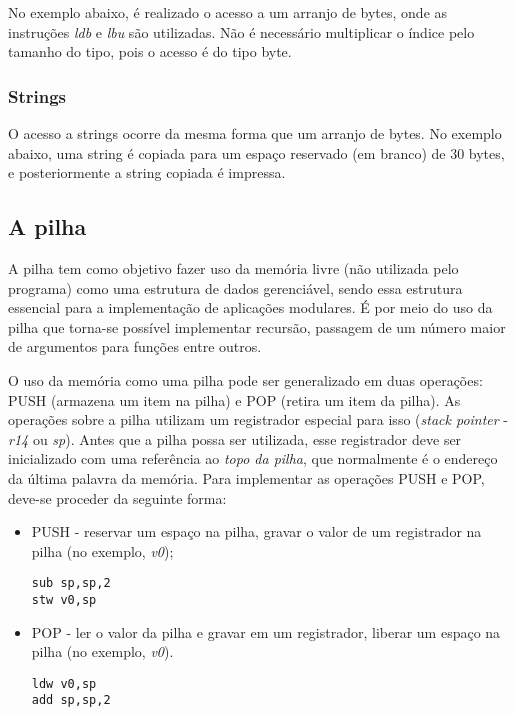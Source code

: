 \documentclass[11pt,a4paper]{report}
\begin{document}


No exemplo abaixo, é realizado o acesso a um arranjo de bytes, onde as
instruções \textit{ldb} e \textit{lbu} são utilizadas. Não é necessário
multiplicar o índice pelo tamanho do tipo, pois o acesso é do tipo byte.



\subsubsection{Strings}

O acesso a strings ocorre da mesma forma que um arranjo de bytes. No
exemplo abaixo, uma string é copiada para um espaço reservado (em
branco) de 30 bytes, e posteriormente a string copiada é impressa.



\subsection{A pilha}

A pilha tem como objetivo fazer uso da memória livre (não utilizada pelo
programa) como uma estrutura de dados gerenciável, sendo essa estrutura
essencial para a implementação de aplicações modulares. É por meio do
uso da pilha que torna-se possível implementar recursão, passagem de
um número maior de argumentos para funções entre outros.

O uso da memória como uma pilha pode ser generalizado em duas operações:
PUSH (armazena um item na pilha) e POP (retira um item da pilha). As
operações sobre a pilha utilizam um registrador especial para isso
(\textit{stack pointer} - \textit{r14} ou \textit{sp}). Antes que a
pilha possa ser utilizada, esse registrador deve ser inicializado com
uma referência ao \textit{topo da pilha}, que normalmente é o endereço
da última palavra da memória. Para implementar as operações PUSH e POP,
deve-se proceder da seguinte forma:

\begin{itemize}
\item PUSH - reservar um espaço na pilha, gravar o valor de um registrador
na pilha (no exemplo, \textit{v0});
\begin{verbatim}
sub sp,sp,2
stw v0,sp
\end{verbatim}
\item POP - ler o valor da pilha e gravar em um registrador, liberar um
espaço na pilha (no exemplo, \textit{v0}).
\begin{verbatim}
ldw v0,sp
add sp,sp,2
\end{verbatim}
\end{itemize}
\end{document}
